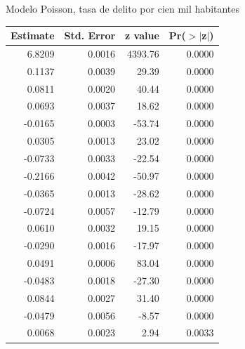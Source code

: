 \documentclass[ignorenonframetext,]{beamer}
\begin{document}
\begin{frame}{Modelo Poisson, tasa de delito por cien mil habitantes}

\begin{table}[ht]
\centering
{\small
\begin{tabular}{rrrr}
  \hline
Estimate & Std. Error & z value & Pr($>$$|$z$|$) \\ 
  \hline
6.8209 & 0.0016 & 4393.76 & 0.0000 \\ 
  0.1137 & 0.0039 & 29.39 & 0.0000 \\ 
  0.0811 & 0.0020 & 40.44 & 0.0000 \\ 
  0.0693 & 0.0037 & 18.62 & 0.0000 \\ 
  -0.0165 & 0.0003 & -53.74 & 0.0000 \\ 
  0.0305 & 0.0013 & 23.02 & 0.0000 \\ 
  -0.0733 & 0.0033 & -22.54 & 0.0000 \\ 
  -0.2166 & 0.0042 & -50.97 & 0.0000 \\ 
  -0.0365 & 0.0013 & -28.62 & 0.0000 \\ 
  -0.0724 & 0.0057 & -12.79 & 0.0000 \\ 
  0.0610 & 0.0032 & 19.15 & 0.0000 \\ 
  -0.0290 & 0.0016 & -17.97 & 0.0000 \\ 
  0.0491 & 0.0006 & 83.04 & 0.0000 \\ 
  -0.0483 & 0.0018 & -27.30 & 0.0000 \\ 
  0.0844 & 0.0027 & 31.40 & 0.0000 \\ 
  -0.0479 & 0.0056 & -8.57 & 0.0000 \\ 
  0.0068 & 0.0023 & 2.94 & 0.0033 \\ 
   \hline
\end{tabular}
}
\end{table}

\end{frame}
\end{document}
